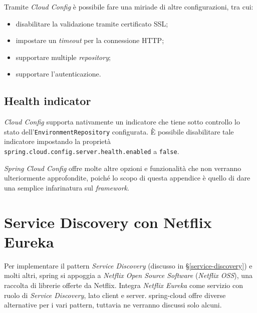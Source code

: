 Tramite \textit{Cloud Config} è possibile fare una miriade di altre configurazioni, tra cui:

\begin{itemize}
	\item disabilitare la validazione tramite certificato SSL;
	\item impostare un \textit{timeout} per la connessione HTTP;
	\item supportare multiple \textit{repository};
	\item supportare l'autenticazione.
\end{itemize}

\subsection{Health indicator} \textit{Cloud Config} supporta nativamente un indicatore che
tiene sotto controllo lo stato dell'\texttt{EnvironmentRepository} configurata.
È possibile disabilitare tale indicatore impostando la proprietà \texttt{spring.cloud.config.server.health.enabled} a \texttt{false}.

\bigskip

\textit{Spring Cloud Config} offre molte altre opzioni e funzionalità che non verranno ulteriormente approfondite, poiché lo scopo di questa appendice è quello di dare una semplice infarinatura sul \textit{framework}.


\section{Service Discovery con Netflix Eureka}

Per implementare il pattern \textit{Service Discovery} (discusso in \S\ref{service-discovery}) e molti altri, \gls{spring} si appoggia a \textit{Netflix Open Source Software} (\textit{Netflix OSS}), una raccolta di librerie offerte da Netflix.
Integra \textit{Netflix Eureka} come servizio con ruolo di \textit{Service Discovery}, lato client e server. \gls{spring-cloud} offre diverse alternative per i vari pattern, tuttavia ne verranno discussi solo alcuni.

